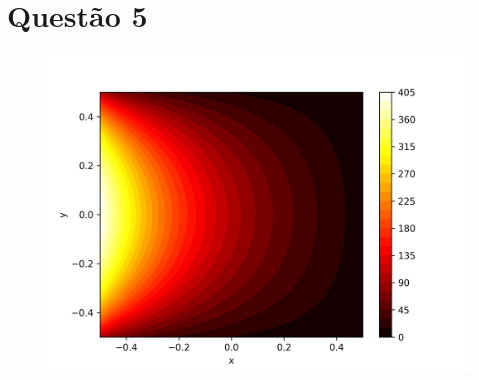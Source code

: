 \documentclass{article}
\begin{document}
\section{Questão 5}
\begin{figure}[h]
\centering
  \includegraphics[width=.8\textwidth]{figs/q5_colorbar.png}
	\label{fig:q5_colobar}
\end{figure}
\end{document}
